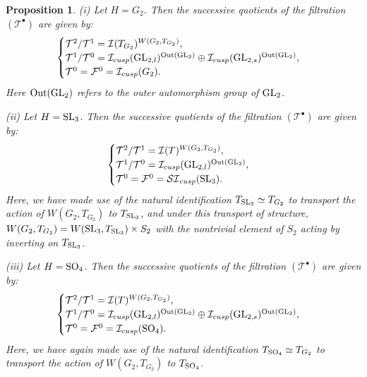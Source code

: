 \documentclass[11pt]{amsart}
\theoremstyle{plain}
\newtheorem{prop}[equation]{Proposition}
\numberwithin{equation}{section}
\def\SL{{\rm SL}}
\def\GL{{\rm GL}}
\def\SO{{\rm SO}}
\begin{document}
\begin{prop} \label{P:image}
\noindent (i) Let $H = G_2$. Then the successive quotients of the filtration $(\mathcal{T}^{\bullet})$ are given by:
\[  \begin{cases}
\mathcal{T}^2/\mathcal{T}^1 =  \mathcal{I}(T_{G_2})^{W(G_2, T_{G_2})},\\
\mathcal{T}^1/\mathcal{T}^0  = \mathcal{I}_{cusp}(\GL_{2,l})^{{\rm Out}(\GL_2)} \oplus   \mathcal{I}_{cusp}(\GL_{2,s})^{{\rm Out}(\GL_2)},\\
\mathcal{T}^0 = \mathcal{F}^0 = \mathcal{I}_{cusp}(G_2).
\end{cases} \]
Here ${\rm Out}(\GL_2)$ refers to the outer automorphism group of $\GL_2$.
\vskip 5pt


(ii) Let $H = \SL_3$. Then the successive quotients of the filtration $(\mathcal{T}^{\bullet})$ are given by:
\[  \begin{cases}
\mathcal{T}^2/\mathcal{T}^1 = \mathcal{I}(T)^{W(G_2, T_{G_2})},  \\
\mathcal{T}^1/\mathcal{T}^0  = \mathcal{I}_{cusp}(\GL_{2,l})^{{\rm Out}(\GL_2)},  \\
\mathcal{T}^0 = \mathcal{F}^0 = \mathcal{SI}_{cusp}(\SL_3).
\end{cases} \]
Here, we have  made use of the natural identification $T_{\SL_3} \simeq T_{G_2}$ to transport the action of $W(G_2, T_{G_2})$ to $T_{\SL_3}$, and under this transport of structure, $W(G_2, T_{G_2}) = W(\SL_3, T_{\SL_3}) \times S_2$ with the nontrivial element of $S_2$ acting by inverting on $T_{\SL_3}$.


 \vskip 10pt

 

\vskip 10pt

\noindent (iii) Let $H = \SO_4$. Then the successive quotients of the filtration $(\mathcal{T}^{\bullet})$ are given by:
\[  \begin{cases}
\mathcal{T}^2/\mathcal{T}^1 =  \mathcal{I}(T)^{W(G_2,T_{G_2})},\\
\mathcal{T}^1/\mathcal{T}^0  = \mathcal{I}_{cusp}(\GL_{2,l})^{{\rm Out}(\GL_2)} \oplus   \mathcal{I}_{cusp}(\GL_{2,s})^{{\rm Out}(\GL_2)},\\
\mathcal{T}^0 = \mathcal{F}^0 = \mathcal{I}_{cusp}(\SO_4).
\end{cases} \]
Here, we have again made use of the natural identification $T_{\SO_4} \simeq T_{G_2}$ to transport the action of $W(G_2, T_{G_2})$ to $T_{\SO_4}$.
\end{prop}
\end{document}
